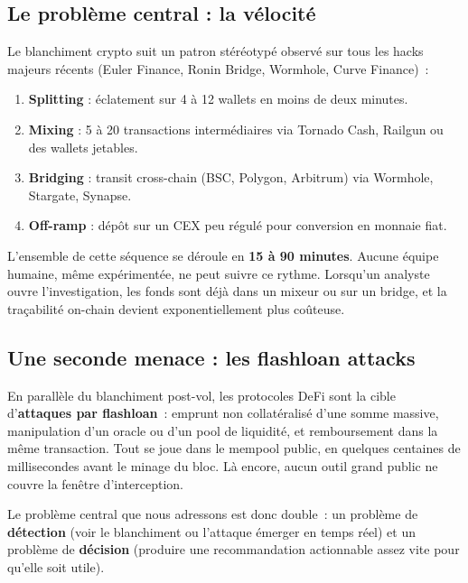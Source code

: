 \documentclass[11pt,a4paper]{article}
\begin{document}
\subsection{Le problème central : la vélocité}

Le blanchiment crypto suit un patron stéréotypé observé sur tous les
hacks majeurs récents (Euler Finance, Ronin Bridge, Wormhole,
Curve Finance)~:

\begin{enumerate}
  \item \textbf{Splitting} : éclatement sur 4 à 12 wallets en moins de
        deux minutes.
  \item \textbf{Mixing} : 5 à 20 transactions intermédiaires via
        Tornado Cash, Railgun ou des wallets jetables.
  \item \textbf{Bridging} : transit cross-chain (BSC, Polygon, Arbitrum)
        via Wormhole, Stargate, Synapse.
  \item \textbf{Off-ramp} : dépôt sur un CEX peu régulé pour conversion
        en monnaie fiat.
\end{enumerate}

L'ensemble de cette séquence se déroule en
\textbf{15 à 90 minutes}. Aucune équipe humaine, même expérimentée, ne
peut suivre ce rythme. Lorsqu'un analyste ouvre l'investigation, les
fonds sont déjà dans un mixeur ou sur un bridge, et la traçabilité
on-chain devient exponentiellement plus coûteuse.

\subsection{Une seconde menace : les flashloan attacks}

En parallèle du blanchiment post-vol, les protocoles DeFi sont la cible
d'\textbf{attaques par flashloan}~: emprunt non collatéralisé d'une
somme massive, manipulation d'un oracle ou d'un pool de liquidité, et
remboursement dans la même transaction. Tout se joue dans le mempool
public, en quelques centaines de millisecondes avant le minage du bloc.
Là encore, aucun outil grand public ne couvre la fenêtre d'interception.

\begin{quote_kv}
Le problème central que nous adressons est donc double~: un problème de
\textbf{détection} (voir le blanchiment ou l'attaque émerger en temps
réel) et un problème de \textbf{décision} (produire une recommandation
actionnable assez vite pour qu'elle soit utile).
\end{quote_kv}
\end{document}
